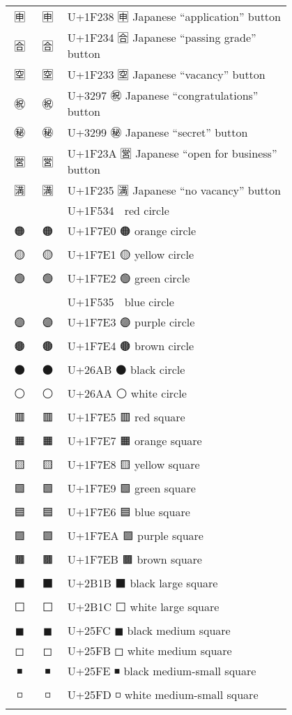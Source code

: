 \documentclass[a4paper,12pt]{article}
\newcommand{\fontA}[1]{{\fontspec[RawFeature={mode=harf,+dist,+ccmp}]{Segoe UI Emoji} #1}}
\newcommand{\fontB}[1]{{\fontspec[RawFeature={mode=harf,+dist,+ccmp}]{Noto Color Emoji} #1}}
\begin{document}
\begin{longtable}[c]{ccp{0.8\linewidth}}
\fontA{🈸}&\fontB{🈸}&U+1F238 🈸 Japanese “application” button\\
\fontA{🈴}&\fontB{🈴}&U+1F234 🈴 Japanese “passing grade” button\\
\fontA{🈳}&\fontB{🈳}&U+1F233 🈳 Japanese “vacancy” button\\
\fontA{㊗}&\fontB{㊗}&U+3297 ㊗ Japanese “congratulations” button\\
\fontA{㊙}&\fontB{㊙}&U+3299 ㊙ Japanese “secret” button\\
\fontA{🈺}&\fontB{🈺}&U+1F23A 🈺 Japanese “open for business” button\\
\fontA{🈵}&\fontB{🈵}&U+1F235 🈵 Japanese “no vacancy” button\\
\fontA{🔴}&\fontB{🔴}&U+1F534 🔴 red circle\\
\fontA{🟠}&\fontB{🟠}&U+1F7E0 🟠 orange circle\\
\fontA{🟡}&\fontB{🟡}&U+1F7E1 🟡 yellow circle\\
\fontA{🟢}&\fontB{🟢}&U+1F7E2 🟢 green circle\\
\fontA{🔵}&\fontB{🔵}&U+1F535 🔵 blue circle\\
\fontA{🟣}&\fontB{🟣}&U+1F7E3 🟣 purple circle\\
\fontA{🟤}&\fontB{🟤}&U+1F7E4 🟤 brown circle\\
\fontA{⚫}&\fontB{⚫}&U+26AB ⚫ black circle\\
\fontA{⚪}&\fontB{⚪}&U+26AA ⚪ white circle\\
\fontA{🟥}&\fontB{🟥}&U+1F7E5 🟥 red square\\
\fontA{🟧}&\fontB{🟧}&U+1F7E7 🟧 orange square\\
\fontA{🟨}&\fontB{🟨}&U+1F7E8 🟨 yellow square\\
\fontA{🟩}&\fontB{🟩}&U+1F7E9 🟩 green square\\
\fontA{🟦}&\fontB{🟦}&U+1F7E6 🟦 blue square\\
\fontA{🟪}&\fontB{🟪}&U+1F7EA 🟪 purple square\\
\fontA{🟫}&\fontB{🟫}&U+1F7EB 🟫 brown square\\
\fontA{⬛}&\fontB{⬛}&U+2B1B ⬛ black large square\\
\fontA{⬜}&\fontB{⬜}&U+2B1C ⬜ white large square\\
\fontA{◼}&\fontB{◼}&U+25FC ◼ black medium square\\
\fontA{◻}&\fontB{◻}&U+25FB ◻ white medium square\\
\fontA{◾}&\fontB{◾}&U+25FE ◾ black medium-small square\\
\fontA{◽}&\fontB{◽}&U+25FD ◽ white medium-small square\\

\end{longtable}
\end{document}
